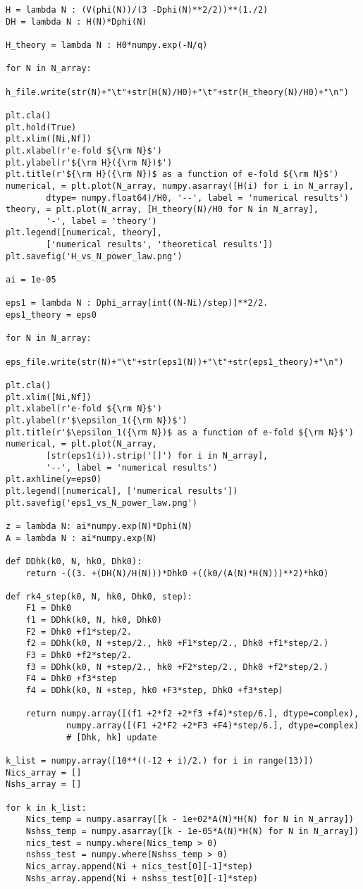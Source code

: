 \documentclass[12pt,a4paper,oneside]{book}
\begin{document}
\begin{appendices}
\begin{small}
\begin{verbatim}
H = lambda N : (V(phi(N))/(3 -Dphi(N)**2/2))**(1./2)
DH = lambda N : H(N)*Dphi(N)

H_theory = lambda N : H0*numpy.exp(-N/q)

for N in N_array:
	h_file.write(str(N)+"\t"+str(H(N)/H0)+"\t"+str(H_theory(N)/H0)+"\n")

plt.cla()
plt.hold(True)
plt.xlim([Ni,Nf])
plt.xlabel(r'e-fold ${\rm N}$')
plt.ylabel(r'${\rm H}({\rm N})$')
plt.title(r'${\rm H}({\rm N})$ as a function of e-fold ${\rm N}$')
numerical, = plt.plot(N_array, numpy.asarray([H(i) for i in N_array], 
		dtype= numpy.float64)/H0, '--', label = 'numerical results')
theory, = plt.plot(N_array, [H_theory(N)/H0 for N in N_array], 
		'-', label = 'theory')
plt.legend([numerical, theory], 
		['numerical results', 'theoretical results'])
plt.savefig('H_vs_N_power_law.png')

ai = 1e-05

eps1 = lambda N : Dphi_array[int((N-Ni)/step)]**2/2.
eps1_theory = eps0

for N in N_array:
	eps_file.write(str(N)+"\t"+str(eps1(N))+"\t"+str(eps1_theory)+"\n")

plt.cla()
plt.xlim([Ni,Nf])
plt.xlabel(r'e-fold ${\rm N}$')
plt.ylabel(r'$\epsilon_1({\rm N})$')
plt.title(r'$\epsilon_1({\rm N})$ as a function of e-fold ${\rm N}$')
numerical, = plt.plot(N_array, 
		[str(eps1(i)).strip('[]') for i in N_array], 
		'--', label = 'numerical results')
plt.axhline(y=eps0)
plt.legend([numerical], ['numerical results'])
plt.savefig('eps1_vs_N_power_law.png')

z = lambda N: ai*numpy.exp(N)*Dphi(N)
A = lambda N : ai*numpy.exp(N)

def DDhk(k0, N, hk0, Dhk0):
    return -((3. +(DH(N)/H(N)))*Dhk0 +((k0/(A(N)*H(N)))**2)*hk0)

def rk4_step(k0, N, hk0, Dhk0, step):
    F1 = Dhk0
    f1 = DDhk(k0, N, hk0, Dhk0)
    F2 = Dhk0 +f1*step/2.
    f2 = DDhk(k0, N +step/2., hk0 +F1*step/2., Dhk0 +f1*step/2.)
    F3 = Dhk0 +f2*step/2.
    f3 = DDhk(k0, N +step/2., hk0 +F2*step/2., Dhk0 +f2*step/2.)
    F4 = Dhk0 +f3*step
    f4 = DDhk(k0, N +step, hk0 +F3*step, Dhk0 +f3*step)   

    return numpy.array([(f1 +2*f2 +2*f3 +f4)*step/6.], dtype=complex), 
    		numpy.array([(F1 +2*F2 +2*F3 +F4)*step/6.], dtype=complex) 
    		# [Dhk, hk] update

k_list = numpy.array([10**((-12 + i)/2.) for i in range(13)])
Nics_array = []
Nshs_array = []

for k in k_list:
    Nics_temp = numpy.asarray([k - 1e+02*A(N)*H(N) for N in N_array])
    Nshss_temp = numpy.asarray([k - 1e-05*A(N)*H(N) for N in N_array])
    nics_test = numpy.where(Nics_temp > 0)
    nshss_test = numpy.where(Nshss_temp > 0)
    Nics_array.append(Ni + nics_test[0][-1]*step)
    Nshs_array.append(Ni + nshss_test[0][-1]*step)


\end{verbatim}
\end{small}
\end{appendices}
\end{document}
